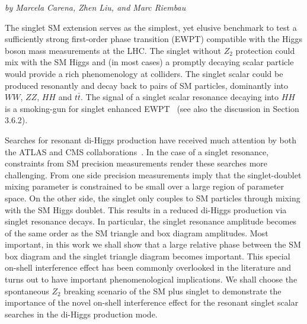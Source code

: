 \begin{center}
    {\it{
 by Marcela Carena, Zhen Liu, and Marc Riembau}}
 \end{center}


The singlet SM extension  serves as the simplest, yet elusive benchmark to test  a sufficiently strong  first-order phase transition (EWPT) compatible with the Higgs boson mass measurements at the LHC.
The singlet without $Z_2$ protection could mix with the SM Higgs and (in most cases) a promptly decaying scalar particle would provide a rich phenomenology at colliders. The singlet scalar could be produced resonantly  and decay back to pairs of SM particles, dominantly into $WW$, $ZZ$, $HH$ and $t\bar t$. The signal of  a singlet scalar resonance decaying into $HH$ is a smoking-gun  for singlet enhanced EWPT~\cite{Profumo:2007wc,Chen:2014ask,Dawson:2015haa,Kotwal:2016tex,Chen:2017qcz,Huang:2017jws,Robens:2016xkb,Lewis:2017dme,Dawson:2016ugw,Huang:2017nnw,deFlorian:2016spz} (see also the discussion in Section 3.6.2). 


Searches for resonant di-Higgs production have received much attention by both the ATLAS and CMS collaborations~\cite{Aaboud:2016xco,Aad:2015xja,Sirunyan:2017djm,CMS-PAS-HIG-17-006,CMS-PAS-HIG-17-008,CMS-PAS-HIG-17-009}. In the case of a singlet resonance,  constraints from SM precision measurements  render these searches more challenging. From one side  precision measurements  imply that  the singlet-doublet mixing parameter is constrained to be small over a large region of parameter space.  On the other side, the singlet only couples to SM particles through mixing with the SM Higgs doublet. This results in a reduced di-Higgs production via singlet resonance decays. In particular, the singlet resonance amplitude  becomes of the same order as the SM  triangle  and box diagram amplitudes. Most important, in this work we shall show that a large relative phase between the SM box diagram and the singlet triangle diagram becomes important. This special on-shell interference  effect  has been  commonly overlooked in the literature and turns out to have important phenomenological implications.
We shall choose the spontaneous $Z_2$ breaking scenario of the SM plus singlet to demonstrate the importance of the novel on-shell interference effect for the resonant singlet scalar searches in the di-Higgs production mode.

\label{sec:model}

